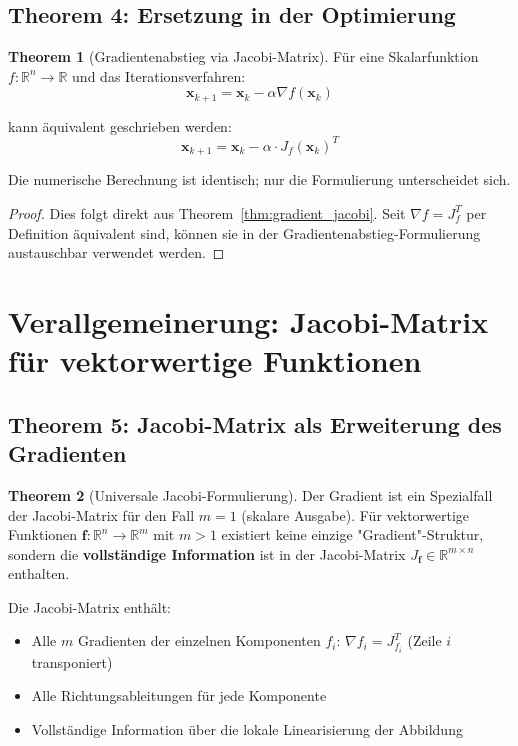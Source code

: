 ﻿\documentclass[a4paper,12pt]{article}
\theoremstyle{definition}
\newtheorem{theorem}{Theorem}
\begin{document}
\subsection{Theorem 4: Ersetzung in der Optimierung}

\begin{theorem}[Gradientenabstieg via Jacobi-Matrix]
	\label{thm:gd}
	Für eine Skalarfunktion $f: \mathbb{R}^n \to \mathbb{R}$ und das Iterationsverfahren:
	\[
	\boldsymbol{x}_{k+1} = \boldsymbol{x}_k - \alpha \nabla f(\boldsymbol{x}_k)
	\]
	
	kann äquivalent geschrieben werden:
	\[
	\boldsymbol{x}_{k+1} = \boldsymbol{x}_k - \alpha \cdot J_f(\boldsymbol{x}_k)^T
	\]
	
	Die numerische Berechnung ist identisch; nur die Formulierung unterscheidet sich.
\end{theorem}

\begin{proof}
	Dies folgt direkt aus Theorem~\ref{thm:gradient_jacobi}. Seit $\nabla f = J_f^T$ per Definition äquivalent sind, können sie in der Gradientenabstieg-Formulierung austauschbar verwendet werden.
\end{proof}

\section{Verallgemeinerung: Jacobi-Matrix für vektorwertige Funktionen}

\subsection{Theorem 5: Jacobi-Matrix als Erweiterung des Gradienten}

\begin{theorem}[Universale Jacobi-Formulierung]
	\label{thm:universal}
	Der Gradient ist ein Spezialfall der Jacobi-Matrix für den Fall $m = 1$ (skalare Ausgabe). Für vektorwertige Funktionen $\boldsymbol{f}: \mathbb{R}^n \to \mathbb{R}^m$ mit $m > 1$ existiert keine einzige "Gradient"-Struktur, sondern die \textbf{vollständige Information} ist in der Jacobi-Matrix $J_{\boldsymbol{f}} \in \mathbb{R}^{m \times n}$ enthalten.
	
	Die Jacobi-Matrix enthält:
	\begin{itemize}
		\item Alle $m$ Gradienten der einzelnen Komponenten $f_i$: $\nabla f_i = J_{f_i}^T$ (Zeile $i$ transponiert)
		\item Alle Richtungsableitungen für jede Komponente
		\item Vollständige Information über die lokale Linearisierung der Abbildung
	\end{itemize}
\end{theorem}
\end{document}
